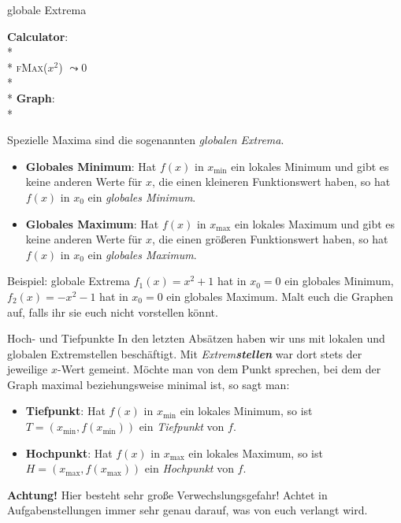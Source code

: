 \begin{bla}{globale Extrema}
  \begin{marginfigure}
    \begin{tcolorbox}[colback=white!95!black,colframe=white!75!black,title=CAS:,arc=0mm]
      \begin{scriptsize}
        \textbf{Calculator}: \\*
         \\*
          \hfill \textsc{fMax}(\( x^2 \)) \( \leadsto 0 \) \\* \ \\*
        \textbf{Graph}: \\*
      \end{scriptsize}
    \end{tcolorbox}
  \end{marginfigure}
  Spezielle Maxima sind die sogenannten \emph{globalen Extrema}.
  \begin{itemize}
    \item \textbf{Globales Minimum}: Hat $f(x)$ in $x_{\min}$ ein lokales Minimum und gibt es keine anderen Werte für $x$, die einen kleineren Funktionswert haben, so hat $f(x)$ in $x_0$ ein \emph{globales Minimum}.
    \item \textbf{Globales Maximum}: Hat $f(x)$ in $x_{\max}$ ein lokales Maximum und gibt es keine anderen Werte für $x$, die einen größeren Funktionswert haben, so hat $f(x)$ in $x_0$ ein \emph{globales Maximum}.
  \end{itemize}
\end{bla}

\begin{bla}{Beispiel: globale Extrema}
  $f_1(x)=x^2+1$ hat in $x_0=0$ ein globales Minimum, \\ $f_2(x)=-x^2-1$ hat in $x_0=0$ ein globales Maximum. Malt euch die Graphen auf, falls ihr sie euch nicht vorstellen könnt.
\end{bla}

\begin{bla}{Hoch- und Tiefpunkte}
  In den letzten Absätzen haben wir uns mit lokalen und globalen Extremstellen beschäftigt. Mit \emph{Extrem\textbf{stellen}} war dort stets der jeweilige $x$-Wert gemeint. Möchte man von dem Punkt sprechen, bei dem der Graph maximal beziehungsweise minimal ist, so sagt man:
  \begin{itemize}
    \item \textbf{Tiefpunkt}: Hat $f(x)$ in $x_{\min}$ ein lokales Minimum, so ist $T=(x_{\min},f(x_{\min}))$ ein \emph{Tiefpunkt} von $f$.
    \item \textbf{Hochpunkt}: Hat $f(x)$ in $x_{\max}$ ein lokales Maximum, so ist $H=(x_{\max},f(x_{\max}))$ ein \emph{Hochpunkt} von $f$.
  \end{itemize}
  \textcolor{red!75!black}{\textbf{Achtung!}} Hier besteht sehr große Verwechslungsgefahr! Achtet in Aufgabenstellungen immer sehr genau darauf, was von euch verlangt wird.
\end{bla}

